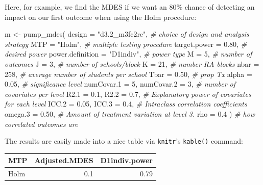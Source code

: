 \documentclass[
]{article}
\newenvironment{Shaded}{\begin{snugshade}}{\end{snugshade}}
\newcommand{\AttributeTok}[1]{\textcolor[rgb]{0.77,0.63,0.00}{#1}}
\newcommand{\CommentTok}[1]{\textcolor[rgb]{0.56,0.35,0.01}{\textit{#1}}}
\newcommand{\DecValTok}[1]{\textcolor[rgb]{0.00,0.00,0.81}{#1}}
\newcommand{\FloatTok}[1]{\textcolor[rgb]{0.00,0.00,0.81}{#1}}
\newcommand{\FunctionTok}[1]{\textcolor[rgb]{0.00,0.00,0.00}{#1}}
\newcommand{\NormalTok}[1]{#1}
\newcommand{\OtherTok}[1]{\textcolor[rgb]{0.56,0.35,0.01}{#1}}
\newcommand{\StringTok}[1]{\textcolor[rgb]{0.31,0.60,0.02}{#1}}
\begin{document}
Here, for example, we find the MDES if we want an 80\% chance of
detecting an impact on our first outcome when using the Holm procedure:

\begin{Shaded}
\begin{Highlighting}[]
\NormalTok{m }\OtherTok{\textless{}{-}} \FunctionTok{pump\_mdes}\NormalTok{(}
            \AttributeTok{design =} \StringTok{"d3.2\_m3fc2rc"}\NormalTok{, }\CommentTok{\# choice of design and analysis strategy}
            \AttributeTok{MTP =} \StringTok{"Holm"}\NormalTok{, }\CommentTok{\# multiple testing procedure}
            \AttributeTok{target.power =} \FloatTok{0.80}\NormalTok{, }\CommentTok{\# desired power}
            \AttributeTok{power.definition =} \StringTok{"D1indiv"}\NormalTok{, }\CommentTok{\# power type}
            \AttributeTok{M =} \DecValTok{5}\NormalTok{, }\CommentTok{\# number of outcomes}
            \AttributeTok{J =} \DecValTok{3}\NormalTok{, }\CommentTok{\# number of schools/block}
            \AttributeTok{K =} \DecValTok{21}\NormalTok{, }\CommentTok{\# number RA blocks}
            \AttributeTok{nbar =} \DecValTok{258}\NormalTok{, }\CommentTok{\# average number of students per school}
            \AttributeTok{Tbar =} \FloatTok{0.50}\NormalTok{, }\CommentTok{\# prop Tx}
            \AttributeTok{alpha =} \FloatTok{0.05}\NormalTok{, }\CommentTok{\# significance level}
            \AttributeTok{numCovar.1 =} \DecValTok{5}\NormalTok{, }\AttributeTok{numCovar.2 =} \DecValTok{3}\NormalTok{, }\CommentTok{\# number of covariates per level}
            \AttributeTok{R2.1 =} \FloatTok{0.1}\NormalTok{, }\AttributeTok{R2.2 =} \FloatTok{0.7}\NormalTok{, }\CommentTok{\# Explanatory power of covariates for each level}
            \AttributeTok{ICC.2 =} \FloatTok{0.05}\NormalTok{, }\AttributeTok{ICC.3 =} \FloatTok{0.4}\NormalTok{, }\CommentTok{\# Intraclass correlation coefficients}
            \AttributeTok{omega.3 =} \FloatTok{0.50}\NormalTok{, }\CommentTok{\# Amount of treatment variation at level 3.}
            \AttributeTok{rho =} \FloatTok{0.4}\NormalTok{ ) }\CommentTok{\# how correlated outcomes are}
\end{Highlighting}
\end{Shaded}

The results are easily made into a nice table via \texttt{knitr}'s
\texttt{kable()} command:

\begin{tabular}{l|r|r}
\hline
MTP & Adjusted.MDES & D1indiv.power\\
\hline
Holm & 0.1 & 0.79\\
\hline
\end{tabular}
\end{document}
